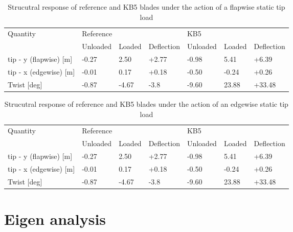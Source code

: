 \begin{table}[pth]
\centering
\caption{Strucutral response of reference and KB5 blades under the action of a flapwise static tip load}
\label{tab:flap_static_load_test}
\begin{tabular}{|l|l|l|l|l|l|l|}
\hline
\multirow{2}{*}{Quantity}  & \multicolumn{3}{l|}{Reference} & \multicolumn{3}{l|}{KB5}       \\ \cline{2-7} 
                           & Unloaded & Loaded & Deflection & Unloaded & Loaded & Deflection \\ \hline
tip - y (flapwise) {[}m{]} & -0.27    & 2.50   & +2.77      & -0.98    & 5.41   & +6.39      \\
tip - x (edgewise) {[}m{]} & -0.01    & 0.17   & +0.18      & -0.50    & -0.24  & +0.26      \\
Twist {[}deg{]}            & -0.87    & -4.67  & -3.8       & -9.60    & 23.88  & +33.48      \\ \hline
\end{tabular}
\end{table}

\begin{table}[pth]
\centering
\caption{Strucutral response of reference and KB5 blades under the action of an edgewise static tip load}
\label{tab:edge_static_load_test}
\begin{tabular}{|l|l|l|l|l|l|l|}
\hline
\multirow{2}{*}{Quantity}  & \multicolumn{3}{l|}{Reference} & \multicolumn{3}{l|}{KB5}       \\ \cline{2-7} 
                           & Unloaded & Loaded & Deflection & Unloaded & Loaded & Deflection \\ \hline
tip - y (flapwise) {[}m{]} & -0.27    & 2.50   & +2.77      & -0.98    & 5.41   & +6.39      \\
tip - x (edgewise) {[}m{]} & -0.01    & 0.17   & +0.18      & -0.50    & -0.24  & +0.26      \\
Twist {[}deg{]}            & -0.87    & -4.67  & -3.8       & -9.60    & 23.88  & +33.48      \\ \hline
\end{tabular}
\end{table}

\section{Eigen analysis}
